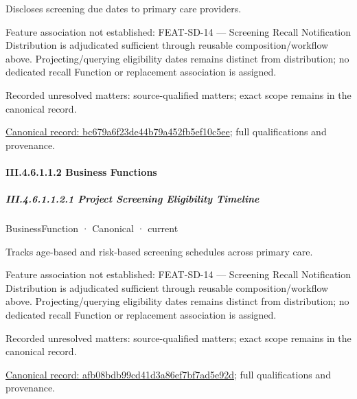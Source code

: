 Discloses screening due dates to primary care providers.



Feature association not established: FEAT-SD-14 — Screening Recall Notification Distribution is adjudicated sufficient through reusable composition/workflow above. Projecting/querying eligibility dates remains distinct from distribution; no dedicated recall Function or replacement association is assigned.


{\small Recorded unresolved matters: source-qualified matters; exact scope remains in the canonical record.}\par
{\footnotesize \href{../../../../continuum/business/business-service/bc679a6f23de44b79a452fb5ef10c5ee.md}{Canonical record: bc679a6f23de44b79a452fb5ef10c5ee}; full qualifications and provenance.}\par
\paragraph*{III.4.6.1.1.2 Business Functions}
\label{navigation:III.4.6.1.1.2}

\subparagraph*{III.4.6.1.1.2.1 Project Screening Eligibility Timeline}
\label{navigation:III.4.6.1.1.2.1}

\label{element:afb08bdb99cd41d3a86ef7bf7ad5e92d}
{\small BusinessFunction · Canonical · current}\par

Tracks age-based and risk-based screening schedules across primary care.



Feature association not established: FEAT-SD-14 — Screening Recall Notification Distribution is adjudicated sufficient through reusable composition/workflow above. Projecting/querying eligibility dates remains distinct from distribution; no dedicated recall Function or replacement association is assigned.


{\small Recorded unresolved matters: source-qualified matters; exact scope remains in the canonical record.}\par
{\footnotesize \href{../../../../continuum/business/business-function/afb08bdb99cd41d3a86ef7bf7ad5e92d.md}{Canonical record: afb08bdb99cd41d3a86ef7bf7ad5e92d}; full qualifications and provenance.}\par
